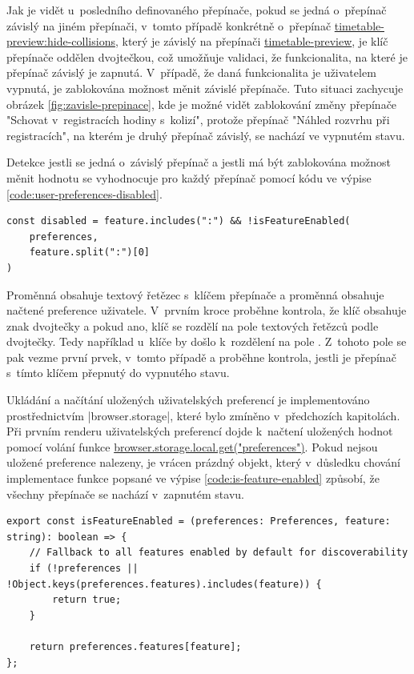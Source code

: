 Jak je vidět u~posledního definovaného přepínače, pokud se jedná o~přepínač závislý na jiném přepínači, v~tomto případě konkrétně o~přepínač \url{timetable-preview:hide-collisions}, který je závislý na přepínači \url{timetable-preview}, je klíč přepínače oddělen dvojtečkou, což umožňuje validaci, že funkcionalita, na které je přepínač závislý je zapnutá. V~případě, že daná funkcionalita je uživatelem vypnutá, je zablokována možnost měnit závislé přepínače. Tuto situaci zachycuje obrázek \ref{fig:zavisle-prepinace}, kde je možné vidět zablokování změny přepínače "Schovat v~registracích hodiny s~kolizí", protože přepínač "Náhled rozvrhu při registracích", na kterém je druhý přepínač závislý, se nachází ve vypnutém stavu.

Detekce jestli se jedná o~závislý přepínač a jestli má být zablokována možnost měnit hodnotu se vyhodnocuje pro každý přepínač pomocí kódu ve výpise \ref{code:user-preferences-disabled}.

\begin{lstlisting}[label={code:user-preferences-disabled}, caption={Detekce stavu závislého přepínače (vlastní zpracování)}]
const disabled = feature.includes(":") && !isFeatureEnabled(
    preferences,
    feature.split(":")[0]
)
\end{lstlisting}

Proměnná  obsahuje textový řetězec s~klíčem přepínače a proměnná  obsahuje načtené preference uživatele. V~prvním kroce proběhne kontrola, že klíč obsahuje znak dvojtečky a pokud ano, klíč se rozdělí na pole textových řetězců podle dvojtečky. Tedy například u~klíče  by došlo k~rozdělení na pole . Z~tohoto pole se pak vezme první prvek, v~tomto případě  a proběhne kontrola, jestli je přepínač s~tímto klíčem přepnutý do vypnutého stavu.


Ukládání a načítání uložených uživatelských preferencí je implementováno prostřednictvím \code|browser.storage|, které bylo zmíněno v~předchozích kapitolách. Při prvním renderu uživatelských preferencí dojde k~načtení uložených hodnot pomocí volání funkce \url{browser.storage.local.get("preferences")}. Pokud nejsou uložené preference nalezeny, je vrácen prázdný objekt, který v~důsledku chování implementace funkce  popsané ve výpise \ref{code:is-feature-enabled} způsobí, že všechny přepínače se nachází v~zapnutém stavu. 

\begin{lstlisting}[label={code:is-feature-enabled}, caption={Definice funkce \code{isFeatureEnabled} (vlastní zpracování).}]
export const isFeatureEnabled = (preferences: Preferences, feature: string): boolean => {
    // Fallback to all features enabled by default for discoverability
    if (!preferences || !Object.keys(preferences.features).includes(feature)) {
        return true;
    }

    return preferences.features[feature];
};
\end{lstlisting}

